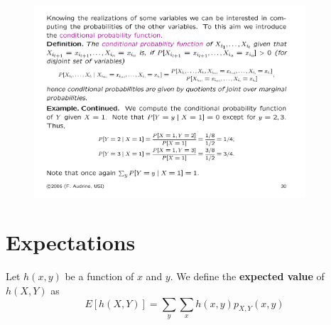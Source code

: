 \documentclass[notes=show,handout]{beamer}\usepackage[]{graphicx}\usepackage[]{color}
\begin{document}
\begin{frame}{\secname}
  \begin{example}
  \begin{figure}[ptb]\centering
  \includegraphics[width=0.9\textwidth,height=0.45\textheight]{img/ex_audrins_2.pdf}
  \end{figure}
  \end{example}
\end{frame}

\section{Expectations}

\begin{frame}{\secname}
\begin{definition}
Let $h(x,y)$ be a function of $x$ and $y$.
We define the \textbf{expected value} of $h\left( X,Y\right) $ as%
\begin{equation*}
E\left[ h\left( X,Y\right) \right] =\sum_{y}\sum_{x}h\left( x,y\right)
p_{X,Y}\left( x,y\right)
\end{equation*}
\end{definition}
\end{frame}%
\end{document}
